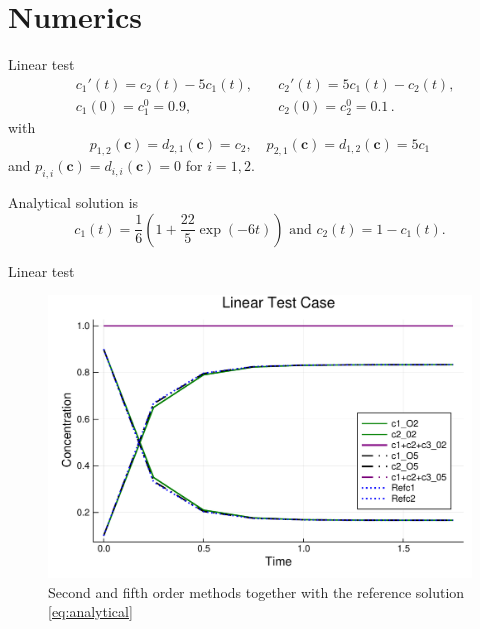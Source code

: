 \documentclass[9pt,compress,t,aspectratio=169]{beamer}
\newcommand{\1}{\begin{pmatrix}
                 1\\
                 1
                \end{pmatrix}}
\def\bc{\mathbf{c}}
\begin{document}
\section{Numerics}
\begin{frame}{Linear test}
\begin{equation}\label{eq:linear_test}
\begin{aligned}
 &c_1'(t)=c_2(t)-5c_1(t),\quad  &c_2'(t)=5c_1(t)-c_2(t),\\
 &c_1(0)=c_1^0=0.9, \quad  &c_2(0)=c_2^0=0.1 \, .
\end{aligned}
\end{equation}
with
\begin{equation*}
  p_{1,2}(\bc)=d_{2,1}(\bc)=c_2, \quad p_{2,1}(\bc)=d_{1,2}(\bc)=5c_1 
\end{equation*}
and $p_{i,i}(\bc)=d_{i,i}(\bc)=0$ for $i=1,2$.

Analytical solution is
\begin{equation}\label{eq:analytical}
 c_1(t)=\frac{1}{6}\left(1 +  \frac{22}{5} \exp(-6t) \right) \text{ and } c_2(t)=1-c_1(t).
\end{equation}

\end{frame}

\begin{frame}{Linear test}
\begin{figure}[!htp]
\centering
    \includegraphics[height=0.7\textheight]{images/LinearOrder25.pdf}
  \caption{ Second and fifth order methods together with the reference solution \eqref{eq:analytical}
 }
  \label{fig:Linear_model}
\end{figure}

\end{frame}
\end{document}
